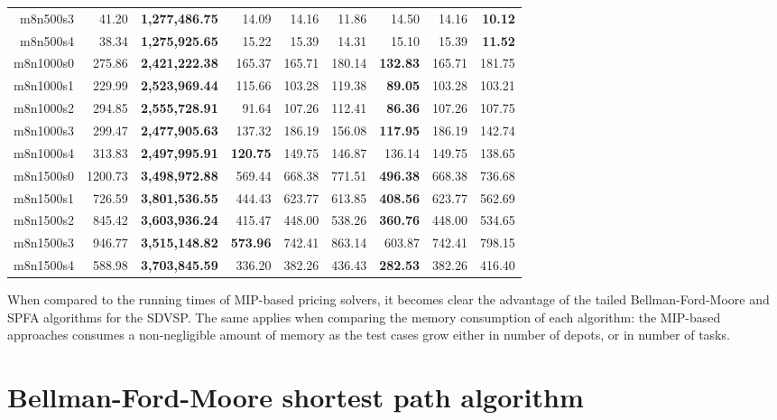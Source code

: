\documentclass{article}
\begin{document}
\begin{table}[!htb]
\begin{tabular}{rrrrrrrrr}
      m8n500s3 & 41.20 & \textbf{1,277,486.75} & 14.09 & 14.16 & 11.86 & 14.50 & 14.16 & \textbf{10.12} \\
      m8n500s4 & 38.34 & \textbf{1,275,925.65} & 15.22 & 15.39 & 14.31 & 15.10 & 15.39 & \textbf{11.52} \\
      m8n1000s0 & 275.86 & \textbf{2,421,222.38} & 165.37 & 165.71 & 180.14 & \textbf{132.83} & 165.71 & 181.75 \\
      m8n1000s1 & 229.99 & \textbf{2,523,969.44} & 115.66 & 103.28 & 119.38 & \textbf{89.05} & 103.28 & 103.21 \\
      m8n1000s2 & 294.85 & \textbf{2,555,728.91} & 91.64 & 107.26 & 112.41 & \textbf{86.36} & 107.26 & 107.75 \\
      m8n1000s3 & 299.47 & \textbf{2,477,905.63} & 137.32 & 186.19 & 156.08 & \textbf{117.95} & 186.19 & 142.74 \\
      m8n1000s4 & 313.83 & \textbf{2,497,995.91} & \textbf{120.75} & 149.75 & 146.87 & 136.14 & 149.75 & 138.65 \\
      m8n1500s0 & 1200.73 & \textbf{3,498,972.88} & 569.44 & 668.38 & 771.51 & \textbf{496.38} & 668.38 & 736.68 \\
      m8n1500s1 & 726.59 & \textbf{3,801,536.55} & 444.43 & 623.77 & 613.85 & \textbf{408.56} & 623.77 & 562.69 \\
      m8n1500s2 & 845.42 & \textbf{3,603,936.24} & 415.47 & 448.00 & 538.26 & \textbf{360.76} & 448.00 & 534.65 \\
      m8n1500s3 & 946.77 & \textbf{3,515,148.82} & \textbf{573.96} & 742.41 & 863.14 & 603.87 & 742.41 & 798.15 \\
      m8n1500s4 & 588.98 & \textbf{3,703,845.59} & 336.20 & 382.26 & 436.43 & \textbf{282.53} & 382.26 & 416.40 \\
      \bottomrule
   \end{tabular}
\end{table}

When compared to the running times of MIP-based pricing solvers, it becomes clear the advantage of the tailed Bellman-Ford-Moore and SPFA algorithms for the SDVSP. The same applies when comparing the memory consumption of each algorithm: the MIP-based approaches consumes a non-negligible amount of memory as the test cases grow either in number of depots, or in number of tasks.




\newpage
\appendix

\section{Bellman-Ford-Moore shortest path algorithm}
\label{appendix:bf-algo}
\end{document}
